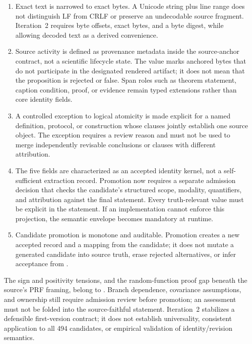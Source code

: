 \begin{enumerate}
  \item Exact text is narrowed to exact bytes. A Unicode string plus line range does not distinguish LF from CRLF or preserve an undecodable source fragment. Iteration~2 requires byte offsets, exact bytes, and a byte digest, while allowing decoded text as a derived convenience.
  \item Source activity is defined as provenance metadata inside the source-anchor contract, not a scientific lifecycle state. The value  marks anchored bytes that do not participate in the designated rendered artifact; it does not mean that the proposition is rejected or false. Span roles such as theorem statement, caption condition, proof, or evidence remain typed extensions rather than core identity fields.
  \item A controlled exception to logical atomicity is made explicit for a named definition, protocol, or construction whose clauses jointly establish one source object. The exception requires a review reason and must not be used to merge independently revisable conclusions or clauses with different attribution.
  \item The five fields are characterized as an accepted identity kernel, not a self-sufficient extraction record. Promotion now requires a separate admission decision that checks the candidate's structured scope, modality, quantifiers, and attribution against the final statement. Every truth-relevant value must be explicit in the statement. If an implementation cannot enforce this projection, the semantic envelope becomes mandatory at runtime.
  \item Candidate promotion is monotone and auditable. Promotion creates a new accepted record and a mapping from the candidate; it does not mutate a generated candidate into source truth, erase rejected alternatives, or infer acceptance from .
\end{enumerate}

The sign and positivity tensions, and the random-function proof gap beneath the source's PRF framing, belong to \ClaimAssessment{}. Branch dependence, covariance assumptions, and ownership still require admission review before promotion; an assessment must not be folded into the source-faithful statement. Iteration~2 stabilizes a defensible first-version contract; it does not establish universality, consistent application to all 494 candidates, or empirical validation of identity/revision semantics.


